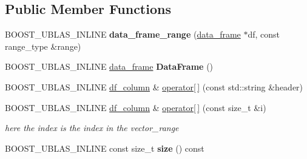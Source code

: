 \subsection*{Public Member Functions}
\begin{DoxyCompactItemize}
\item 
B\+O\+O\+S\+T\+\_\+\+U\+B\+L\+A\+S\+\_\+\+I\+N\+L\+I\+NE {\bfseries data\+\_\+frame\+\_\+range} (\hyperlink{classboost_1_1numeric_1_1ublas_1_1data__frame}{data\+\_\+frame} $\ast$df, const range\+\_\+type \&range)\hypertarget{classboost_1_1numeric_1_1ublas_1_1data__frame__range_a4193ec3f79d994246ea04d24c0fd04f4}{}\label{classboost_1_1numeric_1_1ublas_1_1data__frame__range_a4193ec3f79d994246ea04d24c0fd04f4}

\item 
B\+O\+O\+S\+T\+\_\+\+U\+B\+L\+A\+S\+\_\+\+I\+N\+L\+I\+NE \hyperlink{classboost_1_1numeric_1_1ublas_1_1data__frame}{data\+\_\+frame} {\bfseries Data\+Frame} ()\hypertarget{classboost_1_1numeric_1_1ublas_1_1data__frame__range_a8ff3d84317f7cfece38037188d0ff998}{}\label{classboost_1_1numeric_1_1ublas_1_1data__frame__range_a8ff3d84317f7cfece38037188d0ff998}

\item 
B\+O\+O\+S\+T\+\_\+\+U\+B\+L\+A\+S\+\_\+\+I\+N\+L\+I\+NE \hyperlink{classboost_1_1numeric_1_1ublas_1_1df__column}{df\+\_\+column} \& \hyperlink{classboost_1_1numeric_1_1ublas_1_1data__frame__range_a83d56dfe9f2ce86eba4c9255eb17b2bb}{operator\mbox{[}$\,$\mbox{]}} (const std\+::string \&header)
\item 
B\+O\+O\+S\+T\+\_\+\+U\+B\+L\+A\+S\+\_\+\+I\+N\+L\+I\+NE \hyperlink{classboost_1_1numeric_1_1ublas_1_1df__column}{df\+\_\+column} \& \hyperlink{classboost_1_1numeric_1_1ublas_1_1data__frame__range_aea4194a8602095f16e62b63dd0e16add}{operator\mbox{[}$\,$\mbox{]}} (const size\+\_\+t \&i)
\begin{DoxyCompactList}\small\item\em here the index is the index in the vector\+\_\+range \end{DoxyCompactList}\item 
B\+O\+O\+S\+T\+\_\+\+U\+B\+L\+A\+S\+\_\+\+I\+N\+L\+I\+NE const size\+\_\+t {\bfseries size} () const \hypertarget{classboost_1_1numeric_1_1ublas_1_1data__frame__range_a1d6a04f53085abfe97395901c68092c0}{}\label{classboost_1_1numeric_1_1ublas_1_1data__frame__range_a1d6a04f53085abfe97395901c68092c0}

\end{DoxyCompactItemize}


